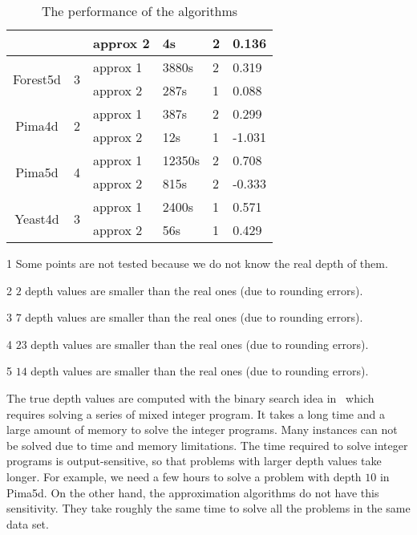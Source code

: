 \documentclass [letterpaper] {article}
\begin{document}
\begin{table}[!htb]
\begin{threeparttable}[b]
\begin{tabular}[center]{|c|c|l|l|l|l|}
      & & approx 2 & 4s & 2 & 0.136 \\
      \hline
      \multirow{2}{*}{Forest5d} & \multirow{2}{*}{3} & approx 1 & 3880s & 2 & 0.319\tnote{2} \\
      & & approx 2 & 287s & 1 & 0.088\tnote{3} \\
      \hline
      \multirow{2}{*}{Pima4d} & \multirow{2}{*}{2} & approx 1 & 387s & 2 & 0.299 \\
      & & approx 2 & 12s & 1 & -1.031\tnote{4} \\
      \hline
      \multirow{2}{*}{Pima5d} & \multirow{2}{*}{4} & approx 1 & 12350s & 2 & 0.708 \\
      & & approx 2 & 815s & 2 & -0.333\tnote{5} \\
      \hline
      \multirow{2}{*}{Yeast4d} & \multirow{2}{*}{3} & approx 1 & 2400s & 1 & 0.571 \\
      & & approx 2 & 56s & 1 & 0.429 \\
      \hline
    \end{tabular}
    \begin{tablenotes}
    \item [1] Some points are not tested because we do not know the real depth of them.
    \item [2] $2$ depth values are smaller than the real ones (due to rounding errors).
    \item [3] $7$ depth values are smaller than the real ones (due to rounding errors).
    \item [4] $23$ depth values are smaller than the real ones (due to rounding errors).
    \item [5] $14$ depth values are smaller than the real ones (due to rounding errors).
    \end{tablenotes}
    \caption{The performance of the algorithms}
    \label{tab:performance}
  \end{threeparttable}
\end{table}


The true depth values are computed with the binary search idea in~\cite{Chen07} which requires solving a series of mixed integer program. It takes a long time and a large amount of memory to solve the integer programs. Many instances can not be solved due to time and memory limitations. The time required to solve integer programs is output-sensitive, so that problems with larger depth values take longer. For example, we need a few hours to solve a problem with depth $10$ in Pima5d. On the other hand, the approximation algorithms do not have this sensitivity. They take roughly the same time to solve all the problems in the same data set.
\end{document}
